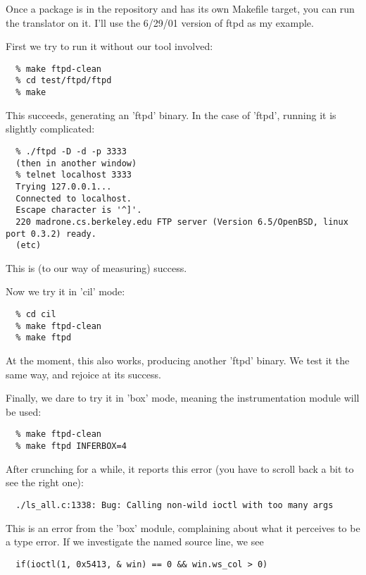 \documentclass{book}
\begin{document}
Once a package is in the repository and has its own Makefile target,
you can run the translator on it.  I'll use the 6/29/01 version of ftpd
as my example.

First we try to run it without our tool involved:

\begin{verbatim}
  % make ftpd-clean
  % cd test/ftpd/ftpd
  % make
\end{verbatim}
  
This succeeds, generating an 'ftpd' binary.  In the case of 'ftpd', 
running it is slightly complicated:

\begin{verbatim}
  % ./ftpd -D -d -p 3333
  (then in another window)
  % telnet localhost 3333
  Trying 127.0.0.1...
  Connected to localhost.
  Escape character is '^]'.
  220 madrone.cs.berkeley.edu FTP server (Version 6.5/OpenBSD, linux port 0.3.2) ready.
  (etc)
\end{verbatim}
  
This is (to our way of measuring) success.

Now we try it in 'cil' mode:

\begin{verbatim}
  % cd cil
  % make ftpd-clean
  % make ftpd
\end{verbatim}
  
At the moment, this also works, producing another 'ftpd' binary.  We test
it the same way, and rejoice at its success.

Finally, we dare to try it in 'box' mode, meaning the instrumentation
module will be used:

\begin{verbatim}
  % make ftpd-clean
  % make ftpd INFERBOX=4
\end{verbatim}
  
After crunching for a while, it reports this error (you have to scroll
back a bit to see the right one):

\begin{verbatim}
  ./ls_all.c:1338: Bug: Calling non-wild ioctl with too many args
\end{verbatim}

This is an error from the 'box' module, complaining about what it
perceives to be a type error.  If we investigate the named source
line, we see

\begin{verbatim}
  if(ioctl(1, 0x5413, & win) == 0 && win.ws_col > 0)
\end{verbatim}
\end{document}
